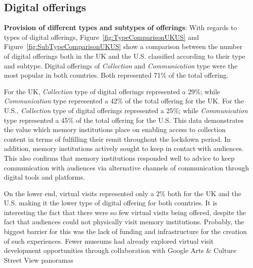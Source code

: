 \documentclass{egpubl}
\begin{document}

\subsection{Digital offerings}
\label{dig}
\noindent \textbf{Provision of different types and subtypes of offerings}:  With regards to types of digital offerings, Figure~\ref{fig:TypeComparisonUKUS} and Figure~\ref{fig:SubTypeComparisonUKUS} show a comparison between the number of digital offerings both in the UK and the U.S. classified according to their type and subtype. Digital offerings of \emph{Collection} and \emph{Communication} type were the most popular in both countries. Both represented 71\% of the total offering. 

For the UK, \emph{Collection} type of digital offerings represented a 29\%; while \emph{Communication} type represented a 42\% of the total offering for the UK. For the U.S., \emph{Collection} type of digital offerings represented a 25\%; while \emph{Communication} type represented a 45\% of the total offering for the U.S. This data demonstrates the value which memory institutions place on enabling access to collection content in terms of fulfilling their remit throughout the lockdown period. In addition, memory institutions actively sought to keep in contact with audiences. This also confirms that memory institutions responded well to advice to keep communication with audiences via alternative channels of communication through digital tools and platforms. 



On the lower end, virtual visits represented only a 2\% both for the UK and the U.S. making it the lower type of digital offering for both countries. It is interesting the fact that there  were so few virtual visits being offered, despite the fact that audiences could not physically visit memory institutions. Probably, the biggest barrier for this was the lack of funding and infrastructure for the creation of such experiences. Fewer museums had already explored virtual visit development opportunities through collaboration with Google Arts \& Culture Street View panoramas 
\end{document}
